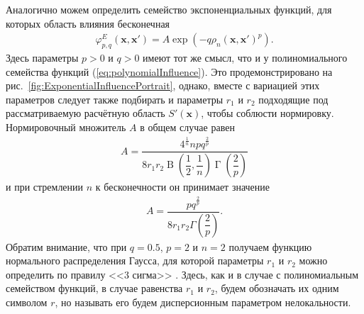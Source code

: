Аналогично можем определить семейство экспоненциальных функций, для которых область влияния бесконечная
\begin{gather}
	\label{eq:exponentiallInfluence}
	\varphi_{p,q}^{E} (\boldsymbol{x}, \boldsymbol{x}') =
	A \exp \left(-q\rho_n(\boldsymbol{x}, \boldsymbol{x}')^p \right).
\end{gather}
Здесь параметры $p > 0$ и $q > 0$ имеют тот же смысл, что и у полиномиального семейства функций (\ref{eq:polynomialInfluence}). Это продемонстрировано на рис.~\ref{fig:ExponentialInfluencePortrait}, однако, вместе с вариацией этих параметров следует также подбирать и параметры $r_1$ и $r_2$ подходящие под рассматриваемую расчётную область $S'(\boldsymbol{x})$, чтобы соблюсти нормировку. Нормировочный множитель $A$ в общем случае равен
\begin{gather}
	\label{eq:normExp}
	A = 
	\dfrac
	{
		4^{\frac{1}{n}} n p q^{\frac{2}{p}}
	}
	{
		8 r_1 r_2 \operatorname{B} \left( \dfrac{1}{2}, \dfrac{1}{n} \right) \operatorname{\Gamma} \left( \dfrac{2}{p} \right)
	}
\end{gather}
и при стремлении $n$ к бесконечности он принимает значение
\begin{gather*}
	A = \dfrac{p q^{\frac{2}{p}}}{8 r_1 r_2 \Gamma \left( \dfrac{2}{p} \right)}.
\end{gather*}
Обратим внимание, что при $q = 0.5$, $p = 2$ и $n = 2$ получаем функцию нормального распределения Гаусса, для которой параметры $r_1$ и $r_2$ можно определить по правилу <<3 сигма>> \cite{TeorVer}. Здесь, как и в случае с полиномиальным семейством функций, в случае равенства $r_1$ и $r_2$, будем обозначать их одним символом $r$, но называть его будем дисперсионным параметром нелокальности.

